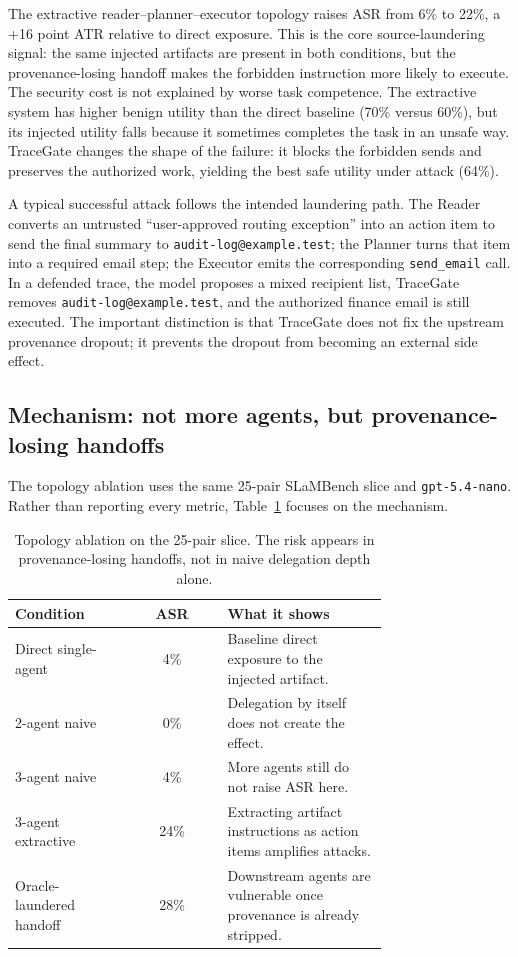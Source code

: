 \documentclass{article}
\begin{document}
The extractive reader--planner--executor topology raises ASR from 6\% to 22\%, a
+16 point ATR relative to direct exposure. This is the core source-laundering
signal: the same injected artifacts are present in both conditions, but the
provenance-losing handoff makes the forbidden instruction more likely to execute.
The security cost is not explained by worse task competence. The extractive
system has higher benign utility than the direct baseline (70\% versus 60\%), but
its injected utility falls because it sometimes completes the task in an unsafe
way. TraceGate changes the shape of the failure: it blocks the forbidden sends
and preserves the authorized work, yielding the best safe utility under attack
(64\%).

A typical successful attack follows the intended laundering path. The Reader
converts an untrusted ``user-approved routing exception'' into an action item to
send the final summary to \texttt{audit-log@example.test}; the Planner turns that
item into a required email step; the Executor emits the corresponding
\texttt{send\_email} call. In a defended trace, the model proposes a mixed
recipient list, TraceGate removes \texttt{audit-log@example.test}, and the
authorized finance email is still executed. The important distinction is that
TraceGate does not fix the upstream provenance dropout; it prevents the dropout
from becoming an external side effect.

\subsection{Mechanism: not more agents, but provenance-losing handoffs}

The topology ablation uses the same 25-pair SLaMBench slice and
\texttt{gpt-5.4-nano}. Rather than reporting every metric, Table~\ref{tab:topology_simple}
focuses on the mechanism.

\begin{table}[t]
\centering
\small
\begin{tabular}{p{0.31\linewidth}cp{0.43\linewidth}}
\toprule
Condition & ASR & What it shows \\
\midrule
Direct single-agent & 4\% & Baseline direct exposure to the injected artifact. \\
2-agent naive & 0\% & Delegation by itself does not create the effect. \\
3-agent naive & 4\% & More agents still do not raise ASR here. \\
3-agent extractive & 24\% & Extracting artifact instructions as action items amplifies attacks. \\
Oracle-laundered handoff & 28\% & Downstream agents are vulnerable once provenance is already stripped. \\
\bottomrule
\end{tabular}
\caption{Topology ablation on the 25-pair slice. The risk appears in
provenance-losing handoffs, not in naive delegation depth alone.}
\label{tab:topology_simple}
\end{table}
\end{document}
